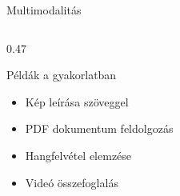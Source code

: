 \documentclass[aspectratio=169, 12pt]{beamer}
\begin{document}
\begin{frame}{Multimodalitás}
\begin{columns}[T,onlytextwidth]
\begin{column}{0.47\textwidth}
      \vspace{0.3cm}

      \begin{block}{Példák a gyakorlatban}
        \begin{itemize}\setlength{\itemsep}{1pt}
          \item Kép leírása szöveggel
          \item PDF dokumentum feldolgozás
          \item Hangfelvétel elemzése
          \item Videó összefoglalás
        \end{itemize}
      \end{block}
    \end{column}
  \end{columns}
\end{frame}
\end{document}
